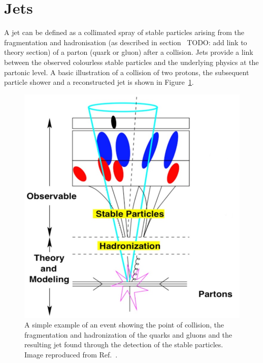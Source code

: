 \section{Jets}
\label{sec:jet} 
\large
A jet can be defined as a collimated spray 
of stable particles arising from the fragmentation
and hadronisation (as described in section~
 TODO: add link to theory section) 
of a parton (quark or gluon) after a collision.
Jets provide a link between the observed colourless 
stable particles and the underlying physics at the partonic
level. A basic illustration of a collision of two protons,
the subsequent particle shower and a reconstructed jet is 
shown in Figure~\ref{fig:jets}.

\begin{figure}[bht]
    \begin{centering}	
    \includegraphics[width=.6\textwidth]{Reconstruction/plots/Jets.jpg}
    \caption{A simple example of an event showing the point of collision, 
    the fragmentation and hadronization of the quarks and gluons and the 
    resulting jet found through the detection of the stable particles. 
    Image reproduced from Ref.~\cite{atkin2015review}.
        }
    \label{fig:jets}
    \end{centering}
\end{figure}

